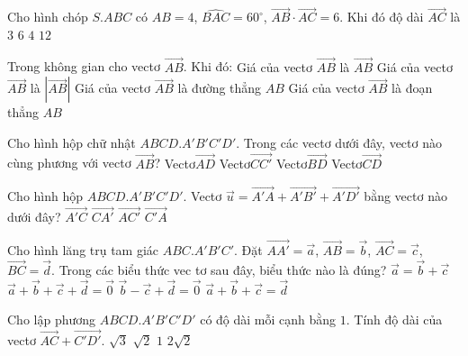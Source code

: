 \begin{ex}
	Cho hình chóp $S.ABC$ có $AB=4$, $\widehat{BAC}=60^\circ$, $\vec{AB} \cdot \vec{AC}=6$. Khi đó độ dài $\vec{AC}$ là
	\choice
	{\True $3$}
	{$6$}
	{$4$}
	{$12$}
\end{ex}
\begin{ex}
	Trong không gian cho vectơ $\vec{AB}$. Khi đó:
	\choice
	{Giá của vectơ $\vec{AB}$ là $\vec{AB}$}
	{Giá của vectơ $\vec{AB}$ là $\left| \vec{AB} \right|$}
	{\True Giá của vectơ $\vec{AB}$ là đường thẳng $AB$}
	{Giá của vectơ $\vec{AB}$ là đoạn thẳng $AB$}
\end{ex}
\begin{ex}
	Cho hình hộp chữ nhật $ABCD.A'B'C'D'$. Trong các vectơ dưới đây, vectơ nào cùng phương với vectơ $\vec{AB}$?
	\choice
	{Vectơ$\vec{AD}$}
	{Vectơ$\vec{CC'}$}
	{Vectơ$\vec{BD}$}
	{\True Vectơ$\vec{CD}$}
\end{ex}
\begin{ex}
	Cho hình hộp $ABCD.A'B'C'D'$. Vectơ $\vec{u}=\vec{A'A}+\vec{A'B'}+\vec{A'D'}$ bằng vectơ nào dưới đây?
	\choice
	{\True $\vec{A'C}$}
	{$\vec{CA'}$}
	{$\vec{AC'}$}
	{$\vec{C'A}$}
\end{ex}
\begin{ex}
	Cho hình lăng trụ tam giác $ABC.A'B'C'$. Đặt $\vec{AA'}=\vec{a}$, $\vec{AB}=\vec{b}$, $\vec{AC}=\vec{c}$, $\vec{BC}=\vec{d}$. Trong các biểu thức vec tơ sau đây, biểu thức nào là đúng?
	\choice
	{$\vec{a}=\vec{b}+\vec{c}$}
	{$\vec{a}+\vec{b}+\vec{c}+\vec{d}=\vec{0}$}
	{\True $\vec{b}-\vec{c}+\vec{d}=\vec{0}$}
	{$\vec{a}+\vec{b}+\vec{c}=\vec{d}$}
\end{ex}
\begin{ex}
	Cho lập phương $ABCD.A'B'C'D'$ có độ dài mỗi cạnh bằng $1$. Tính độ dài của vectơ $\vec{AC}+\vec{C'D'}$.
	\choice
	{$\sqrt{3}$}
	{$\sqrt{2}$}
	{\True $1$}
	{$2\sqrt{2}$}
\end{ex}
